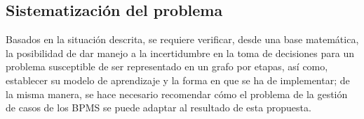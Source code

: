 



\subsection{Sistematización del problema}

Basados en la situación descrita, se requiere verificar, desde una base matemática, la posibilidad de dar manejo a la incertidumbre en la toma de decisiones para un problema susceptible de ser representado en un grafo por etapas, así como, establecer su modelo de aprendizaje y la forma en que se ha de implementar; de la misma manera, se hace necesario recomendar cómo el problema de la gestión de casos de los BPMS se puede adaptar al resultado de esta propuesta. 

